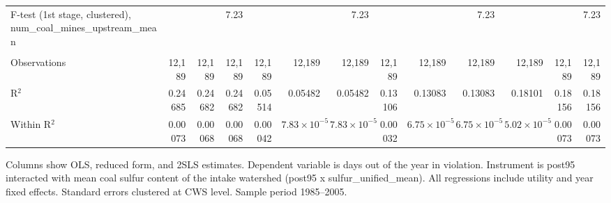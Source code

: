 \begin{table}[htbp]
\begin{adjustbox}{width = \textwidth, center}
\begin{tabular}{lrrrrrrrrrrrr}
         F-test (1st stage, clustered), num\_coal\_mines\_upstream\_mean     &          &          & 7.23     &          &                       & 7.23                  &          &                       & 7.23                  &                       &          & 7.23\\  
         
          \\
         
         Observations                                                        & 12,189   & 12,189   & 12,189   & 12,189   & 12,189                & 12,189                & 12,189   & 12,189                & 12,189                & 12,189                & 12,189   & 12,189\\  
         R$^2$                                                               & 0.24685  & 0.24682  & 0.24682  & 0.05514  & 0.05482               & 0.05482               & 0.13106  & 0.13083               & 0.13083               & 0.18101               & 0.18156  & 0.18156\\  
         Within R$^2$                                                        & 0.00073  & 0.00068  & 0.00068  & 0.00042  & $7.83\times 10^{-5}$  & $7.83\times 10^{-5}$  & 0.00032  & $6.75\times 10^{-5}$  & $6.75\times 10^{-5}$  & $5.02\times 10^{-5}$  & 0.00073  & 0.00073\\  
         
         \bottomrule
         
      \end{tabular}
      
      
      
   \end{adjustbox}
      {\tiny\linespread{1}\selectfont \par \raggedright 
   Columns show OLS, reduced form, and 2SLS estimates. Dependent variable is days out of the year in violation. Instrument is post95 interacted with mean coal sulfur content of the intake watershed (post95 x sulfur\_unified\_mean). All regressions include utility and year fixed effects. Standard errors clustered at CWS level. Sample period 1985--2005.}
   
\end{table}


